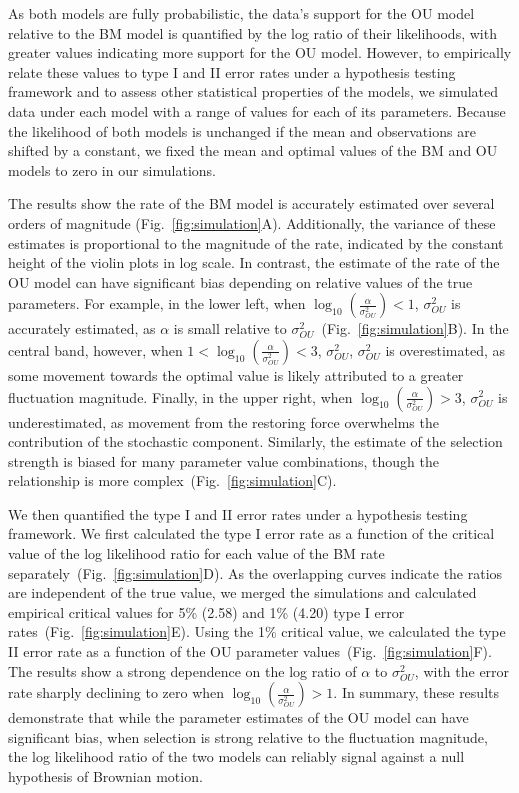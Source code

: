 As both models are fully probabilistic, the data's support for the OU model relative to the BM model is quantified by the log ratio of their likelihoods, with greater values indicating more support for the OU model. However, to empirically relate these values to type I and II error rates under a hypothesis testing framework and to assess other statistical properties of the models, we simulated data under each model with a range of values for each of its parameters. Because the likelihood of both models is unchanged if the mean and observations are shifted by a constant, we fixed the mean and optimal values of the BM and OU models to zero in our simulations.

The results show the rate of the BM model is accurately estimated over several orders of magnitude (Fig.~\ref{fig:simulation}A). Additionally, the variance of these estimates is proportional to the magnitude of the rate, indicated by the constant height of the violin plots in log scale. In contrast, the estimate of the rate of the OU model can have significant bias depending on relative values of the true parameters. For example, in the lower left, when $\log_{10}(\frac{\alpha}{\sigma^2_{OU}}) < 1$, $\sigma^2_{OU}$ is accurately estimated, as $\alpha$ is small relative to $\sigma^2_{OU}$~(Fig.~\ref{fig:simulation}B). In the central band, however, when $1 < \log_{10}(\frac{\alpha}{\sigma^2_{OU}}) < 3$, $\sigma^2_{OU}$, $\sigma^2_{OU}$ is overestimated, as some movement towards the optimal value is likely attributed to a greater fluctuation magnitude. Finally, in the upper right, when $\log_{10}(\frac{\alpha}{\sigma^2_{OU}}) > 3$, $\sigma^2_{OU}$ is underestimated, as movement from the restoring force overwhelms the contribution of the stochastic component. Similarly, the estimate of the selection strength is biased for many parameter value combinations, though the relationship is more complex~(Fig.~\ref{fig:simulation}C).

We then quantified the type I and II error rates under a hypothesis testing framework. We first calculated the type I error rate as a function of the critical value of the log likelihood ratio for each value of the BM rate separately~(Fig.~\ref{fig:simulation}D). As the overlapping curves indicate the ratios are independent of the true value, we merged the simulations and calculated empirical critical values for 5\% (2.58) and 1\% (4.20) type I error rates~(Fig.~\ref{fig:simulation}E). Using the 1\% critical value, we calculated the type II error rate as a function of the OU parameter values~(Fig.~\ref{fig:simulation}F). The results show a strong dependence on the log ratio of $\alpha$ to $\sigma^2_{OU}$, with the error rate sharply declining to zero when $\log_{10}(\frac{\alpha}{\sigma^2_{OU}}) > 1$. In summary, these results demonstrate that while the parameter estimates of the OU model can have significant bias, when selection is strong relative to the fluctuation magnitude, the log likelihood ratio of the two models can reliably signal against a null hypothesis of Brownian motion.

